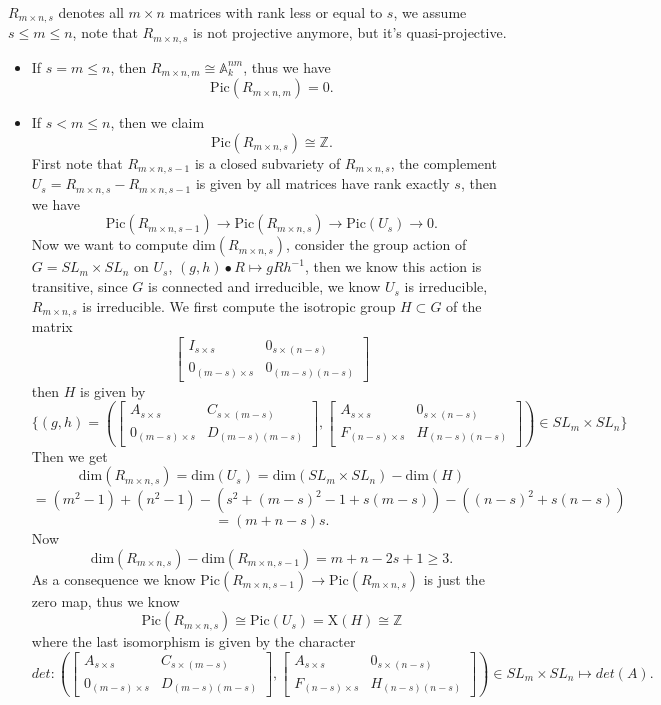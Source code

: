 \documentclass[../main.tex]{subfiles}
\begin{document}
\begin{example}
$R_{m\times n,s}$ denotes all $m\times n$ matrices with rank less or equal to $s$, we assume $s\leq m\leq n$, note that $R_{m \times n,s}$ is not projective anymore, but it's quasi-projective.
\begin{itemize}
\item If $s=m\leq n$, then $R_{m\times n,m}\cong \mathbb{A}_{k}^{nm}$, thus we have 
$$\mathrm{Pic}(R_{m\times n,m})=0.$$
\item If $s<m\leq n$, then we claim 
$$\mathrm{Pic}(R_{m\times n,s})\cong \mathbb{Z}.$$ 
First note that $R_{m\times n, s-1}$ is a closed subvariety of $R_{m\times n,s}$, the complement $U_{s}=R_{m\times n,s}-R_{m\times n, s-1}$ is given by all matrices have rank exactly $s$, then we have
$$\mathrm{Pic}(R_{m\times n,s-1})\rightarrow \mathrm{Pic}(R_{m\times n,s})\rightarrow \mathrm{Pic}(U_{s})\rightarrow 0.$$
Now we want to compute $\mathrm{dim}(R_{m\times n,s})$, consider the group action of $G=SL_{m}\times SL_{n}$ on $U_{s}$, $(g,h)\bullet R\mapsto gRh^{-1}$, then we know this action is transitive, since $G$ is connected and irreducible, we know $U_{s}$ is irreducible, $R_{m\times n, s}$ is irreducible. We first compute the isotropic group $H\subset G$ of the matrix
$$\begin{bmatrix}I_{s\times s} & 0_{s\times (n-s)}\\
0_{(m-s)\times s} & 0_{(m-s)(n-s)}\end{bmatrix}$$
then $H$ is given by 
$$\{(g,h)=(\begin{bmatrix}A_{s\times s} & C_{s\times (m-s)}\\
0_{(m-s)\times s} & D_{(m-s)(m-s)}\end{bmatrix}, \begin{bmatrix}A_{s\times s} & 0_{s\times (n-s)}\\F_{(n-s)\times s} & H_{(n-s)(n-s)}\end{bmatrix})\in SL_{m}\times SL_{n}\}$$
Then we get 
$$\mathrm{dim}(R_{m\times n,s})=\mathrm{dim}(U_{s})=\mathrm{dim}(SL_{m}\times SL_{n})-\mathrm{dim}(H)$$
$$=(m^{2}-1)+(n^{2}-1)-(s^{2}+(m-s)^{2}-1+s(m-s))-((n-s)^{2}+s(n-s))$$
$$=(m+n-s)s.$$
Now $$\mathrm{dim}(R_{m\times n,s})-\mathrm{dim}(R_{m\times n,s-1})=m+n-2s+1\geq 3.$$
As a consequence we know $\mathrm{Pic}(R_{m\times n,s-1})\rightarrow \mathrm{Pic}(R_{m\times n,s})$ is just the zero map, thus we know 
$$\mathrm{Pic}(R_{m\times n,s})\cong \mathrm{Pic}(U_{s})=\mathrm{X}(H)\cong \mathbb{Z}$$
where the last isomorphism is given by the character
$$det: (\begin{bmatrix}A_{s\times s} & C_{s\times (m-s)}\\
0_{(m-s)\times s} & D_{(m-s)(m-s)}\end{bmatrix}, \begin{bmatrix}A_{s\times s} & 0_{s\times (n-s)}\\F_{(n-s)\times s} & H_{(n-s)(n-s)}\end{bmatrix})\in SL_{m}\times SL_{n}\mapsto det(A).$$
\end{itemize}

\end{example}
\end{document}
